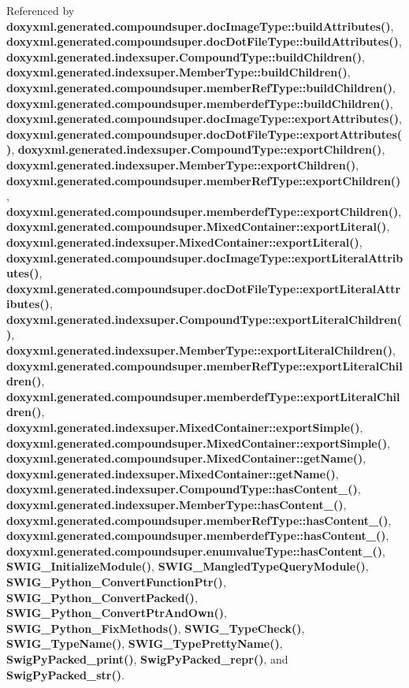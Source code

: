 Referenced by {\bf doxyxml.\+generated.\+compoundsuper.\+doc\+Image\+Type\+::build\+Attributes()}, {\bf doxyxml.\+generated.\+compoundsuper.\+doc\+Dot\+File\+Type\+::build\+Attributes()}, {\bf doxyxml.\+generated.\+indexsuper.\+Compound\+Type\+::build\+Children()}, {\bf doxyxml.\+generated.\+indexsuper.\+Member\+Type\+::build\+Children()}, {\bf doxyxml.\+generated.\+compoundsuper.\+member\+Ref\+Type\+::build\+Children()}, {\bf doxyxml.\+generated.\+compoundsuper.\+memberdef\+Type\+::build\+Children()}, {\bf doxyxml.\+generated.\+compoundsuper.\+doc\+Image\+Type\+::export\+Attributes()}, {\bf doxyxml.\+generated.\+compoundsuper.\+doc\+Dot\+File\+Type\+::export\+Attributes()}, {\bf doxyxml.\+generated.\+indexsuper.\+Compound\+Type\+::export\+Children()}, {\bf doxyxml.\+generated.\+indexsuper.\+Member\+Type\+::export\+Children()}, {\bf doxyxml.\+generated.\+compoundsuper.\+member\+Ref\+Type\+::export\+Children()}, {\bf doxyxml.\+generated.\+compoundsuper.\+memberdef\+Type\+::export\+Children()}, {\bf doxyxml.\+generated.\+compoundsuper.\+Mixed\+Container\+::export\+Literal()}, {\bf doxyxml.\+generated.\+indexsuper.\+Mixed\+Container\+::export\+Literal()}, {\bf doxyxml.\+generated.\+compoundsuper.\+doc\+Image\+Type\+::export\+Literal\+Attributes()}, {\bf doxyxml.\+generated.\+compoundsuper.\+doc\+Dot\+File\+Type\+::export\+Literal\+Attributes()}, {\bf doxyxml.\+generated.\+indexsuper.\+Compound\+Type\+::export\+Literal\+Children()}, {\bf doxyxml.\+generated.\+indexsuper.\+Member\+Type\+::export\+Literal\+Children()}, {\bf doxyxml.\+generated.\+compoundsuper.\+member\+Ref\+Type\+::export\+Literal\+Children()}, {\bf doxyxml.\+generated.\+compoundsuper.\+memberdef\+Type\+::export\+Literal\+Children()}, {\bf doxyxml.\+generated.\+indexsuper.\+Mixed\+Container\+::export\+Simple()}, {\bf doxyxml.\+generated.\+compoundsuper.\+Mixed\+Container\+::export\+Simple()}, {\bf doxyxml.\+generated.\+compoundsuper.\+Mixed\+Container\+::get\+Name()}, {\bf doxyxml.\+generated.\+indexsuper.\+Mixed\+Container\+::get\+Name()}, {\bf doxyxml.\+generated.\+indexsuper.\+Compound\+Type\+::has\+Content\+\_\+()}, {\bf doxyxml.\+generated.\+indexsuper.\+Member\+Type\+::has\+Content\+\_\+()}, {\bf doxyxml.\+generated.\+compoundsuper.\+member\+Ref\+Type\+::has\+Content\+\_\+()}, {\bf doxyxml.\+generated.\+compoundsuper.\+memberdef\+Type\+::has\+Content\+\_\+()}, {\bf doxyxml.\+generated.\+compoundsuper.\+enumvalue\+Type\+::has\+Content\+\_\+()}, {\bf S\+W\+I\+G\+\_\+\+Initialize\+Module()}, {\bf S\+W\+I\+G\+\_\+\+Mangled\+Type\+Query\+Module()}, {\bf S\+W\+I\+G\+\_\+\+Python\+\_\+\+Convert\+Function\+Ptr()}, {\bf S\+W\+I\+G\+\_\+\+Python\+\_\+\+Convert\+Packed()}, {\bf S\+W\+I\+G\+\_\+\+Python\+\_\+\+Convert\+Ptr\+And\+Own()}, {\bf S\+W\+I\+G\+\_\+\+Python\+\_\+\+Fix\+Methods()}, {\bf S\+W\+I\+G\+\_\+\+Type\+Check()}, {\bf S\+W\+I\+G\+\_\+\+Type\+Name()}, {\bf S\+W\+I\+G\+\_\+\+Type\+Pretty\+Name()}, {\bf Swig\+Py\+Packed\+\_\+print()}, {\bf Swig\+Py\+Packed\+\_\+repr()}, and {\bf Swig\+Py\+Packed\+\_\+str()}.

